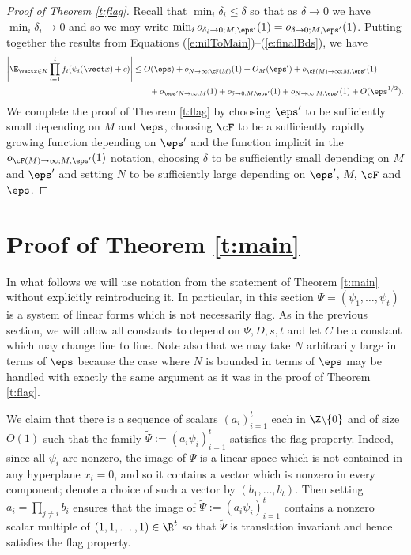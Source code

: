 \begin{proof}[Proof of Theorem \ref{t:flag}]
Recall that $\min_i \delta_i \leq \delta$  so that as $\delta \to 0$ we have $\min_i \delta_i \to 0$ and so we may write  $\min_i o_{\delta_i\to 0;M,\eps'}(1) = o_{\delta \to 0;M,\eps'}(1)$. Putting together the results from Equations (\ref{e:nilToMain})--(\ref{e:finalBds}), we have
\begin{align*}
\left|\E_{\vect x \in K}\prod_{i=1}^t  f_i(\psi_i(\vect x) + c)\right|&\leq  O(\eps)  + o_{N\to \infty; \cF(M)}(1) + O_{M}(\eps') + o_{\cF(M)\to \infty;M,\eps'}(1)\\ &\qquad   + o_{\eps'N\to \infty;M}(1) + o_{\delta \to 0;M,\eps'}(1) + o_{N\to \infty;M,\eps'}(1) + O(\eps^{1/2}).
\end{align*}
We complete the proof of Theorem \ref{t:flag} by choosing $\eps'$ to be sufficiently small depending on $M$ and $\eps$, choosing $\cF$ to be a sufficiently rapidly growing function depending on $\eps'$ and the function implicit in the $o_{\cF(M)\to \infty;M,\eps'}(1)$ notation,  choosing $\delta$ to be sufficiently small depending on $M$ and $\eps'$  and setting $N$ to be sufficiently large depending on $\eps'$, $M$, $\cF$ and $\eps$. 
\end{proof}



\section{Proof of Theorem \ref{t:main}}
In what follows we will use notation from the statement of Theorem \ref{t:main} without explicitly reintroducing it. In particular, in this section $\Psi= (\psi_1,\ldots, \psi_t)$ is a system of linear forms which is not necessarily flag.  As in the previous section, we will allow all constants to depend on $\Psi, D, s, t$ and let $C$ be a constant which may change line to line. Note also that we may take $N$ arbitrarily large in terms of $\eps$ because the case where $N$ is bounded in terms of $\eps$ may be handled with exactly the same argument as it was in the proof of Theorem \ref{t:flag}.

We claim that there is a sequence of scalars $(a_i)_{i=1}^t$ each in $\Z\backslash \{0\}$ and of size $O(1)$ such that the family $\tilde \Psi := (a_i  \psi_i)_{i=1}^t$ satisfies the flag property. Indeed, since all $\psi_i$ are nonzero, the image of $\Psi$ is a linear space which is not contained in any hyperplane $x_i=0$, and so it contains a vector which is nonzero in every component; denote a choice of such a vector by $(b_1, \ldots, b_t)$. Then setting $a_i = \prod_{j \ne i} b_i$ ensures that the image of $\tilde \Psi := ( a_i  \psi_i)_{i=1}^t$ contains a nonzero scalar multiple of $(1,1,\ldots, 1) \in \R^t$ so that $\tilde \Psi$ is translation invariant and hence satisfies the flag property. 

